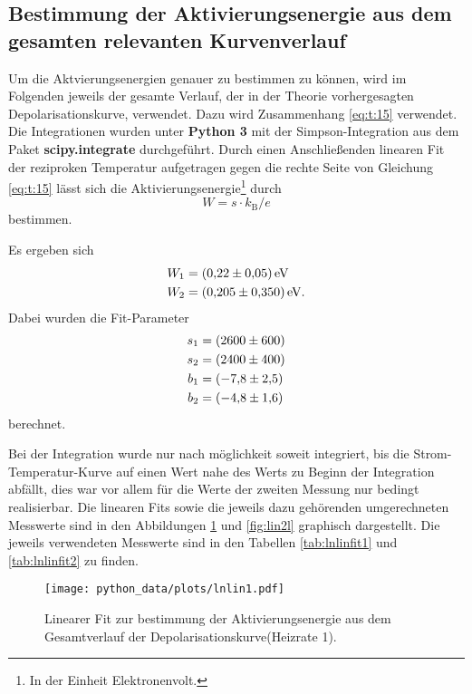 \subsection{Bestimmung der Aktivierungsenergie aus dem gesamten relevanten Kurvenverlauf}
\label{subsec:method2}

Um die Aktvierungsenergien genauer zu bestimmen zu können, wird im Folgenden jeweils der gesamte Verlauf, der in der Theorie vorhergesagten Depolarisationskurve,
verwendet. Dazu wird Zusammenhang \eqref{eq:t:15} verwendet. Die Integrationen wurden unter \textbf{Python 3} mit der Simpson-Integration aus dem Paket \textbf{scipy.integrate} durchgeführt.
Durch einen Anschließenden linearen Fit der reziproken Temperatur aufgetragen gegen die rechte Seite von Gleichung \eqref{eq:t:15} lässt sich die
Aktivierungsenergie\footnote{In der Einheit Elektronenvolt.} durch
\\
\begin{equation}
  \label{eqn:W2}
  W = s \cdot k_\text{B} / e
\end{equation}
bestimmen.


Es ergeben sich
\\
\begin{align*}
  W_{1} &= \SI{0.22+-0.05}{\electronvolt} \\
  W_{2} &= \SI{0.205+-0.35}{\electronvolt}.
\end{align*}
Dabei wurden die Fit-Parameter
\\
\begin{align*}
  s_{1} &= \SI{2600+-600}{}  \\
  s_{2} &= \SI{2400+-400}{}  \\
  b_{1} &= \SI{-7.8+-2.5}{}  \\
  b_{2} &= \SI{-4.8+-1.6}{}
\end{align*}
berechnet.


Bei der Integration wurde nur nach möglichkeit soweit integriert, bis die Strom-Temperatur-Kurve auf einen Wert nahe des Werts zu Beginn der Integration abfällt, dies war vor allem für
die Werte der zweiten Messung nur bedingt realisierbar.
Die linearen Fits sowie die jeweils dazu gehörenden umgerechneten Messwerte sind in den Abbildungen \ref{fig:lin1l} und \ref{fig:lin2l} graphisch dargestellt.
Die jeweils verwendeten Messwerte sind in den Tabellen \ref{tab:lnlinfit1} und \ref{tab:lnlinfit2} zu finden.
\\

\begin{figure}
  \centering
  \texttt{[image: python\_data/plots/lnlin1.pdf]}
  \caption{Linearer Fit zur bestimmung der Aktivierungsenergie aus dem Gesamtverlauf der Depolarisationskurve(Heizrate 1).}
  \label{fig:lin1l}
\end{figure}


